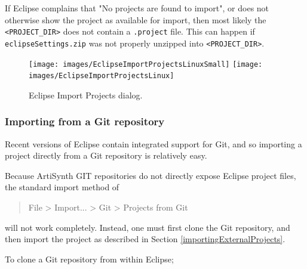 \begin{sideblock}
If Eclipse complains that {\sf "No projects are found to import"}, or
does not otherwise show the project as available for import,
then most likely the {\tt <PROJECT\_DIR>}
\directory{} does not contain a {\tt .project} file. This 
can happen if {\tt eclipseSettings.zip} was not properly unzipped into
{\tt <PROJECT\_DIR>}.
\end{sideblock}

\begin{figure}
\begin{center}
\iflatexml
   \texttt{[image: images/EclipseImportProjectsLinuxSmall]}
\else
   \texttt{[image: images/EclipseImportProjectsLinux]}
\fi   
\end{center}
\caption{Eclipse Import Projects dialog.}%
\label{EclipseImportProjects:fig}
\end{figure}

\subsubsection{Importing from a Git repository}
\label{importingFromGit}

Recent versions of Eclipse contain integrated support for Git, and so
importing a project directly from a Git repository is relatively easy.

Because ArtiSynth GIT repositories do not directly expose Eclipse
project files, the standard import method of
%
\begin{quote}
{\sf File > Import... > Git > Projects from Git}
\end{quote}
%
will not work completely. Instead, one must
first clone the Git repository, and then import the
project \directory{} as described in
Section \ref{importingExternalProjects}.

To clone a Git repository from within Eclipse;

